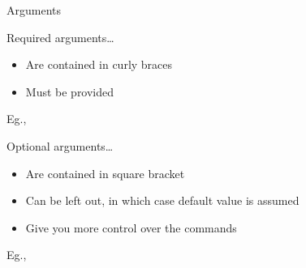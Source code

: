 \documentclass[10pt,times]{beamer}
\begin{document}
\begin{frame}{Arguments}
\begin{block}{Required arguments\ldots}
\begin{itemize}
\item Are contained in curly braces
\item Must be provided
\end{itemize}
Eg., 
\end{block}

\begin{block}{Optional arguments\ldots}
\begin{itemize}
\item Are contained in square bracket
\item Can be left out, in which case default value is assumed
\item Give you more control over the commands
\end{itemize}
Eg., 
\end{block}
\end{frame}


\end{document}
